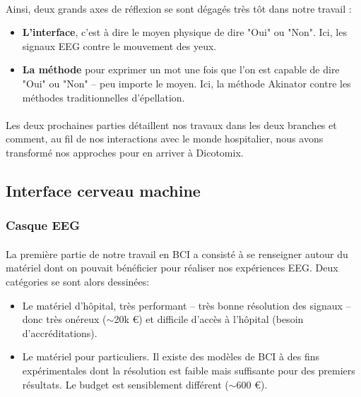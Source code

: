 \documentclass[11pt,a4paper]{article}
\theoremstyle{plain}
\theoremstyle{definition}
\begin{document}
\paragraph{} Ainsi, deux grands axes de réflexion se sont dégagés très tôt dans notre travail :
\begin{itemize}
\item \textbf{L'interface}, c'est à dire le moyen physique de dire "Oui" ou "Non". Ici, les signaux EEG contre le mouvement des yeux.
\item \textbf{La méthode} pour exprimer un mot une fois que l'on est capable de dire "Oui" ou "Non" -- peu importe le moyen. Ici, la méthode Akinator contre 
les méthodes traditionnelles d'épellation.
\end{itemize}

\paragraph{} Les deux prochaines parties détaillent nos travaux dans les deux branches et comment, au fil de nos interactions avec le monde hospitalier, nous avons transformé nos approches pour en arriver à Dicotomix.

\subsection{Interface cerveau machine}
\subsubsection{Casque EEG}
\paragraph{} La première partie de notre travail en BCI a consisté à se renseigner autour du matériel dont on pouvait bénéficier pour réaliser nos expériences EEG. Deux catégories se sont alors dessinées:
\begin{itemize}
    \item Le matériel d'hôpital, très performant -- très bonne résolution des signaux -- donc très onéreux ($\sim$20k \euro{}) et difficile d'accès à l'hôpital (besoin d'accréditations).
    \item Le matériel pour particuliers. Il existe des modèles de BCI à des fins expérimentales dont la résolution
    est faible mais suffisante pour des premiers résultats. Le budget est sensiblement différent ($\sim$600 \euro{}).
\end{itemize}
\end{document}
